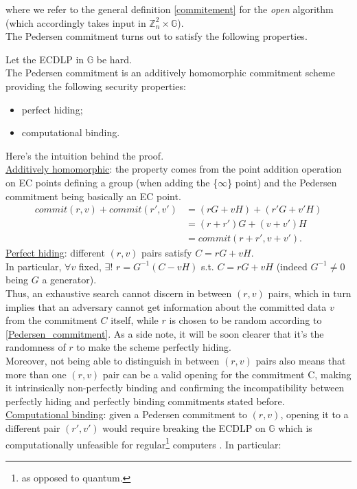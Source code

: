 \noindent
where we refer to the general definition \ref{commitement} for the \textit{open} algorithm (which accordingly takes input in $\mathbb{Z}_n^2 \times \mathbb{G}$).\\
The Pedersen commitment turns out to satisfy the following properties.
\begin{myprop}
    Let the ECDLP in $\mathbb{G}$ be hard.\\ The Pedersen commitment is an additively homomorphic commitment scheme providing the following security properties: \begin{itemize}
        \item perfect hiding;
        \item computational binding.
    \end{itemize}
\end{myprop}
\noindent Here's the intuition behind the proof.\\
\underline{Additively homomorphic}: the property comes from the point addition operation on EC points defining a group (when adding the \{$\infty$\} point) and the Pedersen commitment being basically an EC point.
    \begin{align*}
        commit(r,v) + commit(r',v') &= (rG + vH) + (r'G + v'H)\\
        &= (r + r')G + (v + v')H \\ &= commit(r+r', v+v').
    \end{align*}
\underline{Perfect hiding}: different $(r,v)$ pairs satisfy $C = rG + vH$.\\ In particular, $\forall v$ fixed, $\exists!$ $r = G^{-1}(C - vH)$ s.t. $C = rG + vH$ (indeed $G^{-1} \neq 0$ being $G$ a generator).\\
Thus, an exhaustive search cannot discern in between $(r,v)$ pairs, which in turn implies that an adversary cannot get information about the committed data $v$ from the commitment $C$ itself, while $r$ is chosen to be random according to \ref{Pedersen_commitment}. As a side note, it will be soon clearer that it's the randomness of $r$ to make the scheme perfectly hiding.\\
Moreover, not being able to distinguish in between $(r,v)$ pairs also means that more than one $(r,v)$ pair can be a valid opening for the commitment C, making it intrinsically non-perfectly binding and confirming the incompatibility between perfectly hiding and perfectly binding commitments stated before.\\
\underline{Computational binding}: given a Pedersen commitment to $(r,v)$, opening it to a different pair $(r',v')$ would require breaking the ECDLP on $\mathbb{G}$ which is computationally unfeasible for regular\footnote{as opposed to quantum.} computers . In particular:
